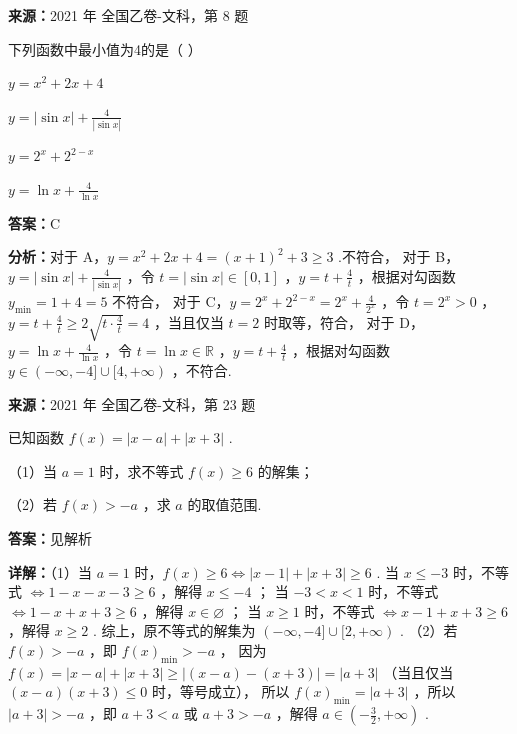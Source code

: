 \begin{question}[points=5]
\textbf{来源：}2021 年 全国乙卷-文科，第 8 题\par
下列函数中最小值为4的是（ ）
\begin{choices}
  \item $y = x^2 + 2x + 4$
  \item $y = |\sin x| + \frac{4}{|\sin x|}$
  \item $y = 2^x + 2^{2-x}$
  \item $y = \ln x + \frac{4}{\ln x}$
\end{choices}
\begin{solution}
\textbf{答案：}C

\textbf{分析：}对于 A，$y = x^2 + 2x + 4 = (x+1)^2 + 3 \ge 3$ .不符合，
对于 B，$y = |\sin x| + \frac{4}{|\sin x|}$ ，令 $t = |\sin x| \in [0,1]$ ，$y = t + \frac{4}{t}$ ，根据对勾函数 $y_{\min} = 1 + 4 = 5$ 不符合，
对于 C，$y = 2^x + 2^{2-x} = 2^x + \frac{4}{2^x}$ ，令 $t = 2^x > 0$ ，$y = t + \frac{4}{t} \ge 2\sqrt{t \cdot \frac{4}{t}} = 4$ ，当且仅当 $t=2$ 时取等，符合，
对于 D，$y = \ln x + \frac{4}{\ln x}$ ，令 $t = \ln x \in \mathbb{R}$ ，$y = t + \frac{4}{t}$ ，根据对勾函数 $y \in (-\infty, -4] \cup [4, +\infty)$ ，不符合.
\end{solution}
\end{question}

\begin{question}[points=10]
\textbf{来源：}2021 年 全国乙卷-文科，第 23 题\par
已知函数 $f(x) = |x-a| + |x+3|$ .

（1）当 $a=1$ 时，求不等式 $f(x) \ge 6$ 的解集；

（2）若 $f(x) > -a$ ，求 $a$ 的取值范围.
\begin{solution}
\textbf{答案：}见解析

\textbf{详解：}（1）当 $a=1$ 时，$f(x) \ge 6 \iff |x-1| + |x+3| \ge 6$ .
当 $x \le -3$ 时，不等式 $\iff 1-x - x - 3 \ge 6$ ，解得 $x \le -4$ ；
当 $-3 < x < 1$ 时，不等式 $\iff 1-x + x + 3 \ge 6$ ，解得 $x \in \varnothing$ ；
当 $x \ge 1$ 时，不等式 $\iff x-1 + x+3 \ge 6$ ，解得 $x \ge 2$ .
综上，原不等式的解集为 $(-\infty, -4] \cup [2, +\infty)$ .
（2）若 $f(x) > -a$ ，即 $f(x)_{\min} > -a$ ，
因为 $f(x) = |x-a| + |x+3| \ge |(x-a) - (x+3)| = |a+3|$ （当且仅当 $(x-a)(x+3) \le 0$ 时，等号成立），
所以 $f(x)_{\min} = |a+3|$ ，所以 $|a+3| > -a$ ，即 $a+3 < a$ 或 $a+3 > -a$ ，解得 $a \in \left(-\frac{3}{2}, +\infty\right)$ .
\end{solution}
\end{question}

